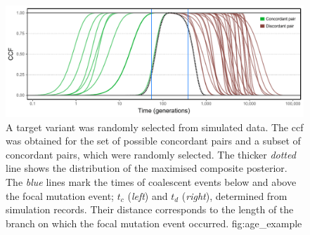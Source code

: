 

\begin{figure}[!htb]
\centering
\includegraphics[width=\textwidth]{./img/ch5/age_example_new}
%
{A target variant was randomly selected from simulated data.
The \gls{ccf} was obtained for the set of possible concordant pairs and a subset of concordant pairs, which were randomly selected.
The thicker \emph{dotted} line shows the distribution of the maximised composite posterior.
The \emph{blue} lines mark the times of coalescent events below and above the focal mutation event; \ie $t_c$ (\emph{left}) and $t_d$ (\emph{right}), determined from simulation records.
Their distance corresponds to the length of the branch on which the focal mutation event occurred.}%
{fig:age_example}
\end{figure}
